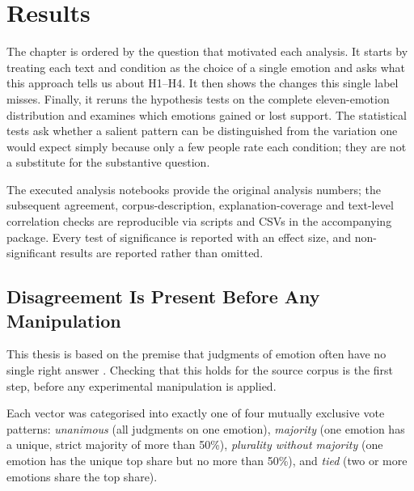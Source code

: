 \chapter{Results}
\label{c:result}

\noindent
The chapter is ordered by the question that motivated each analysis. It starts by treating each
text and condition as the choice of a single emotion and asks what this approach tells us about
H1--H4. It then shows the changes this single label misses. Finally,
it reruns the hypothesis tests on the complete eleven-emotion distribution and examines which
emotions gained or lost support. The statistical tests ask whether a salient pattern can be
distinguished from the variation one would expect simply because only a few people rate each
condition; they are not a substitute for the substantive question.

The executed analysis notebooks provide the original analysis numbers; the subsequent
agreement, corpus-description, explanation-coverage and text-level correlation checks are
reproducible via scripts and CSVs in the accompanying package. Every test of significance is
reported with an effect size, and non-significant results are reported rather than omitted.

\section{Disagreement Is Present Before Any Manipulation}
\label{res:votepatterns}

\noindent
This thesis is based on the premise that judgments of emotion often have no single right answer
\cite{Pavlick2019InherentDisagreement, Uma2021Survey}. Checking that this holds for the source
corpus is the first step, before any experimental manipulation is applied.

Each vector was categorised into exactly one of four mutually exclusive vote patterns:
\emph{unanimous} (all judgments on one emotion), \emph{majority} (one emotion has a unique,
strict majority of more than 50\%), \emph{plurality without majority} (one emotion has the unique
top share but no more than 50\%), and \emph{tied} (two or more emotions share the top share).

